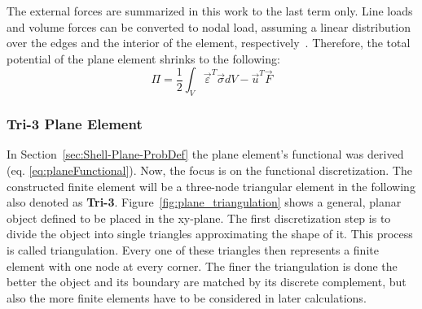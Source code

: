   The external forces are summarized in this work to the last term only. Line loads and volume forces can be converted to nodal load, assuming a linear distribution over the edges and the interior of the element, respectively~\cite{steinke2005finite}. Therefore, the total potential of the plane element shrinks to the following:
  \begin{equation}\label{eq:planeFunctional}
  \Pi = \frac{1}{2} \int_{V}\vec{\varepsilon}^T\vec{\sigma}dV - \vec{u}^T \vec{F}
  \end{equation}
  
  
  
  
  
  
  
  
  \subsubsection{Tri-3 Plane Element}\label{sec:Shell-Plane-Tri}
  In Section~\ref{sec:Shell-Plane-ProbDef} the plane element's functional was derived (eq. \eqref{eq:planeFunctional}). Now, the focus is on the functional discretization. The constructed finite element will be a three-node triangular element in the following also denoted as \textbf{Tri-3}. Figure~\ref{fig:plane_triangulation} shows a general, planar object defined to be placed in the xy-plane. The first discretization step is to divide the object into single triangles approximating the shape of it. This process is called triangulation. Every one of these triangles then represents a finite element with one node at every corner. The finer the triangulation is done the better the object and its boundary are matched by its discrete complement, but also the more finite elements have to be considered in later calculations.
